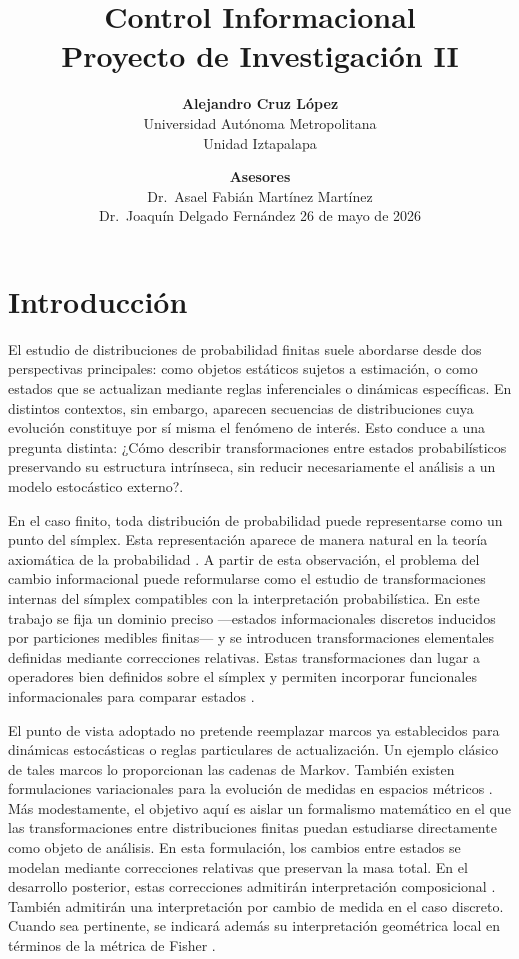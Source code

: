 \documentclass[12pt]{article}
\title{Control Informacional\\
\large Proyecto de Investigación II }
\author{
\textbf{Alejandro Cruz López} \\
Universidad Autónoma Metropolitana \\
Unidad Iztapalapa
}
\date{
\vspace{1em}
\textbf{Asesores} \\[0.3em]
Dr.\ Asael Fabián Martínez Martínez \\
Dr.\ Joaquín Delgado Fernández
\vspace{2em}
26 de mayo de 2026
}
\begin{document}
\maketitle
\tableofcontents
\clearpage


\section*{Introducción}

El estudio de distribuciones de probabilidad finitas suele abordarse desde dos perspectivas principales: como objetos estáticos sujetos a estimación, o como estados que se actualizan mediante reglas inferenciales o dinámicas específicas. En distintos contextos, sin embargo, aparecen secuencias de distribuciones cuya evolución constituye por sí misma el fenómeno de interés. Esto conduce a una pregunta distinta: ¿Cómo describir transformaciones entre estados probabilísticos preservando su estructura intrínseca, sin reducir necesariamente el análisis a un modelo estocástico externo?.

En el caso finito, toda distribución de probabilidad puede representarse como un punto del símplex. Esta representación aparece de manera natural en la teoría axiomática de la probabilidad \citep{Kolmogorov1933}. A partir de esta observación, el problema del cambio informacional puede reformularse como el estudio de transformaciones internas del símplex compatibles con la interpretación probabilística. En este trabajo se fija un dominio preciso ---estados informacionales discretos inducidos por particiones medibles finitas--- y se introducen transformaciones elementales definidas mediante correcciones relativas. Estas transformaciones dan lugar a operadores bien definidos sobre el símplex y permiten incorporar funcionales informacionales para comparar estados \citep{Csiszar1975}.

El punto de vista adoptado no pretende reemplazar marcos ya establecidos para dinámicas estocásticas o reglas particulares de actualización. Un ejemplo clásico de tales marcos lo proporcionan las cadenas de Markov. También existen formulaciones variacionales para la evolución de medidas en espacios métricos \citep{JordanKinderlehrerOtto1998}. Más modestamente, el objetivo aquí es aislar un formalismo matemático en el que las transformaciones entre distribuciones finitas puedan estudiarse directamente como objeto de análisis. En esta formulación, los cambios entre estados se modelan mediante correcciones relativas que preservan la masa total. En el desarrollo posterior, estas correcciones admitirán interpretación composicional \citep{Aitchison1986}. También admitirán una interpretación por cambio de medida en el caso discreto. Cuando sea pertinente, se indicará además su interpretación geométrica local en términos de la métrica de Fisher \citep{Amari2016}.
\end{document}
